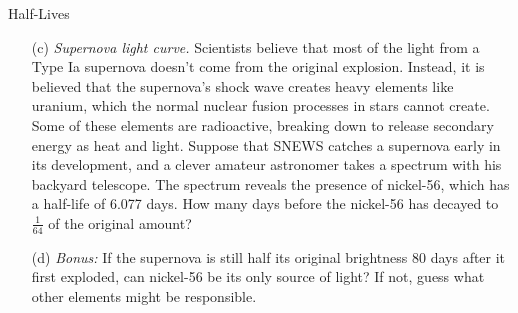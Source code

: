 \documentclass[12pt]{article}
\begin{document}
\begin{probdesc}{7}{Half-Lives}
\begin{enumerate}
\item[(c)] {\em Supernova light curve.}  Scientists believe that most
  of the light from a Type Ia supernova doesn't come from the original
  explosion.  Instead, it is believed that the supernova's shock wave
  creates heavy elements like uranium, which the normal nuclear fusion
  processes in stars cannot create.  Some of these elements are
  radioactive, breaking down to release secondary energy as heat and
  light.  Suppose that SNEWS catches a supernova early in its
  development, and a clever amateur astronomer takes a spectrum with
  his backyard telescope.  The spectrum reveals the presence of
  nickel-56, which has a half-life of 6.077 days.  How many days
  before the nickel-56 has decayed to $\frac{1}{64}$ of the original
  amount?

\item[(d)] {\em Bonus:} If the supernova is still half its original
  brightness 80 days after it first exploded, can nickel-56 be its
  only source of light?  If not, guess what other elements might be
  responsible.
\end{enumerate}
\end{probdesc}
\end{document}
